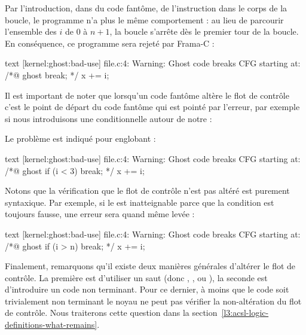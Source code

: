 

Par l'introduction, dans du code fantôme, de l'instruction  dans
le corps de la boucle, le programme n'a plus le même comportement : au lieu de
parcourir l'ensemble des $i$ de $0$ à $n+1$, la boucle s'arrête dès le premier
tour de la boucle. En conséquence, ce programme sera rejeté par Frama-C :


\begin{CodeBlock}{text}
[kernel:ghost:bad-use] file.c:4: Warning:
  Ghost code breaks CFG starting at:
  /*@ ghost break; */
  x += i;
\end{CodeBlock}


Il est important de noter que lorsqu'un code fantôme altère le flot de contrôle
c'est le point de départ du code fantôme qui est pointé par l'erreur, par exemple
si nous introduisons une conditionnelle autour de notre  :




Le problème est indiqué pour  englobant :


\begin{CodeBlock}{text}
[kernel:ghost:bad-use] file.c:4: Warning:
  Ghost code breaks CFG starting at:
  /*@ ghost if (i < 3) break; */
  x += i;
\end{CodeBlock}


Notons que la vérification que le flot de contrôle n'est pas altéré est purement
syntaxique. Par exemple, si le  est inatteignable parce que la
condition est toujours fausse, une erreur sera quand même levée :




\begin{CodeBlock}{text}
[kernel:ghost:bad-use] file.c:4: Warning:
  Ghost code breaks CFG starting at:
  /*@ ghost if (i > n) break; */
  x += i;
\end{CodeBlock}


Finalement, remarquons qu'il existe deux manières générales d'altérer le flot de
contrôle. La première est d'utiliser un saut (donc ,
, ou ), la seconde est d'introduire un code
non terminant. Pour ce dernier, à moins que le code soit trivialement non terminant
le noyau ne peut pas vérifier la non-altération du flot de contrôle. Nous traiterons
cette question dans la section~\ref{l3:acsl-logic-definitions-what-remains}.


